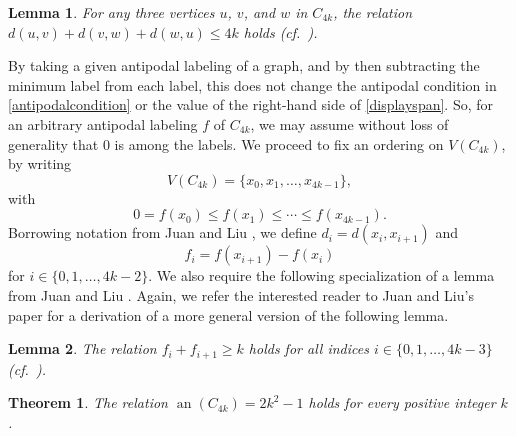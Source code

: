 \documentclass[10pt,a4paper]{amsart}
\newtheorem{theorem}{Theorem}
\newtheorem{lemma}{Lemma}%
\begin{document}
\begin{lemma}\label{lemmadistance}
 For any three vertices $u$, $v$, and $w$ in $C_{4k}$, the relation 
 $ d(u, v) + d(v, w) + d(w, u) \leq 4 k $
 holds (cf.\ \cite[Proposition 1]{JuanLiu2012}). 
\end{lemma}

 By taking a given antipodal labeling of a graph, and by then subtracting the minimum label from each label, this does not change the 
 antipodal condition in \eqref{antipodalcondition} or the value of the right-hand side of \eqref{displayspan}. So, for an arbitrary antipodal 
 labeling $f$ of $C_{4k}$, we may assume without loss of generality that $0$ is among the labels. We proceed to fix an ordering on 
 $V(C_{4k})$, by writing 
\begin{equation}\label{VC4k} 
 V(C_{4k}) = \{ x_0, x_1, \ldots, x_{4k-1} \}, 
\end{equation}
 with 
\begin{equation}\label{orderfx} 
 0 = f(x_0) \leq f(x_1) \leq \cdots \leq f(x_{4k-1}). 
\end{equation}
 Borrowing notation from Juan and Liu \cite{JuanLiu2012}, we define $d_{i} = d(x_{i}, x_{i+1})$ and 
\begin{equation}\label{definefi} 
 f_{i} = f(x_{i+1}) - f(x_{i})
\end{equation}
 for $i \in \{ 0, 1, \ldots, 4k-2 \}$. We also require the following specialization of a lemma from Juan and Liu \cite[Lemma 2]{JuanLiu2012}. 
 Again, we refer the interested reader to Juan and Liu's paper for a derivation of a more general version of 
 the following lemma. 
 
\begin{lemma}\label{boundfsum}
 The relation $f_{i} + f_{i+1} \geq k$ holds for all indices 
 $i \in \{ 0, 1, \ldots, 4k - 3 \}$ (cf.\ \cite[Lemma 2]{JuanLiu2012}). 
\end{lemma} 


\begin{theorem}\label{maintheorem}
 The relation $\operatorname{an}(C_{4k}) = 2k^2 - 1$ holds for every positive integer $k$. 
\end{theorem}
\end{document}
